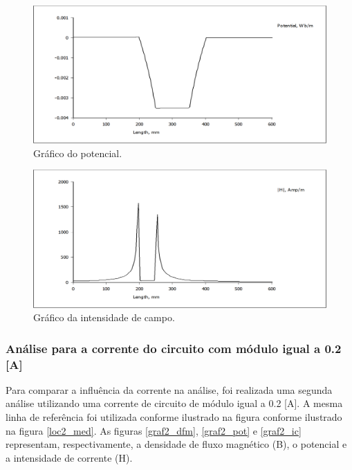 \begin{figure}[H]
\centering
\includegraphics[scale=0.3]{img/linha_pot.png}
\caption[Gráfico do potencial]{Gráfico do potencial.}
\label{graf_pot}
\end{figure}

\begin{figure}[H]
\centering
\includegraphics[scale=0.3]{img/linha_H.png}
\caption[Gráfico da intensidade de campo]{Gráfico da intensidade de campo.}
\label{graf_ic}
\end{figure}

\subsubsection{Análise para a corrente do circuito com módulo igual a 0.2 [A]}
Para comparar a influência da corrente na análise, foi realizada uma segunda análise utilizando uma corrente de circuito de módulo igual a 0.2 [A]. A mesma linha de referência foi utilizada conforme ilustrado na figura conforme ilustrado na figura \ref{loc2_med}. As figuras \ref{graf2_dfm}, \ref{graf2_pot} e \ref{graf2_ic} representam, respectivamente, a densidade de fluxo magnético (B), o potencial e a intensidade de corrente (H).

